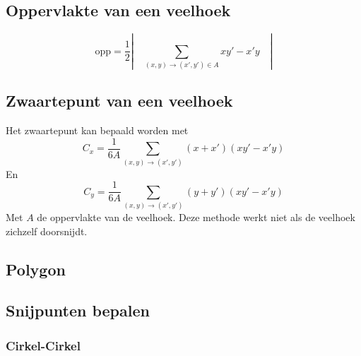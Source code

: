 \documentclass[10pt,a4paper,titlepage]{article}
\begin{document}
\subsection{Oppervlakte van een veelhoek}
\[
\text{opp} = \frac{1}{2} \left| \quad \sum_{(x,y) \rightarrow (x', y') \in A} xy' - x'y \quad \right|
 \]


\subsection{Zwaartepunt van een veelhoek}

Het zwaartepunt kan bepaald worden met
\[
C_x = \frac{1}{6A} \sum_{(x,y)\to(x',y')} (x+x')(xy' - x'y)
\]
En 
\[
C_y = \frac{1}{6A} \sum_{(x,y)\to(x',y')} (y+y')(xy' - x'y)
\]
Met $A$ de oppervlakte van de veelhoek.
Deze methode werkt niet als de veelhoek zichzelf doorsnijdt.

\subsection{Polygon}

%
\iffalse
\subsection{Snijpunten bepalen}

\subsubsection{Cirkel-Cirkel}
\end{document}
